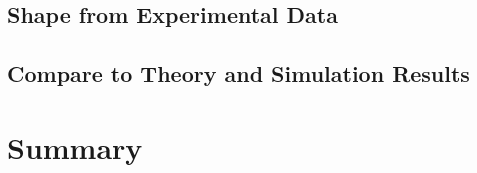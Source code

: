 \subsection{Shape from Experimental Data}
\label{sub:shape_from_experimental_data}

\subsection{Compare to Theory and Simulation Results}
\label{sub:compare_to_theory_and_simulation_results}


\section{Summary}
\label{sec:summary}



